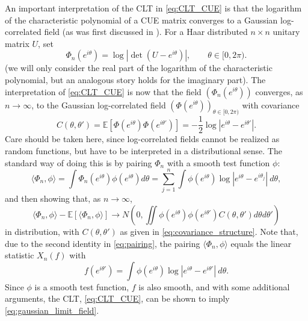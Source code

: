 \documentclass[11pt]{amsart}
\theoremstyle{plain}
\theoremstyle{remark}
\numberwithin{equation}{section}
\begin{document}
An important interpretation of the CLT in \eqref{eq:CLT_CUE} is that the logarithm of the characteristic polynomial of a CUE matrix converges to a Gaussian log-correlated field (as was first discussed in \cite{HKOC}). For  a Haar distributed $n\times n$ unitary matrix $U$, set 
\begin{equation}\label{eq:def_char_pol}
    \Phi_n(e^{i \theta}) = \log |\det (U-e^{i \theta})|, \qquad \theta \in [0,2 \pi).
\end{equation}
(we will only consider the real part of the logarithm of the characteristic polynomial, but an analogous story holds for the imaginary part). The interpretation of \eqref{eq:CLT_CUE} is now that the field $(\Phi_n(e^{i \theta}))$ converges, as $n \to \infty$, to the Gaussian log-correlated field $(\Phi(e^{i \theta}))_{\theta\in [0,2 \pi)}$ with covariance  
%
%
%
%
\begin{equation}
    \label{eq:covariance_structure}
    C(\theta,\theta')
    =\mathbb E \left[
    \Phi(e^{i \theta})\Phi(e^{i \theta'})
    \right]=-\frac{1}{2}\log|e^{i \theta}-e^{i \theta'}|. 
\end{equation}
Care should be taken here, since log-correlated fields cannot be realized as random functions, but have to be interpreted in a distributional sense. 
The standard way of doing this is by pairing $\Phi_n$ with a smooth test function $\phi$:
\begin{equation}
    \label{eq:pairing}
    \langle \Phi_n, \phi\rangle= \int \Phi_n(e^{i \theta}) \phi(e^{i \theta})d \theta
    = \sum_{j=1}^n \int \phi(e^{i \theta}) \log |e^{i \theta}-e^{i \theta_j}|\  d \theta,
\end{equation}
and then showing that, as $n\to \infty$,
\begin{equation}\label{eq:gaussian_limit_field}
 \langle \Phi_n, \phi\rangle-\mathbb E \left[ \langle \Phi_n, \phi\rangle\right]
 \to N\left(0,\iint \phi(e^{i \theta}) \phi(e^{i \theta'}) C(\theta,\theta') d\theta d\theta' \right)
\end{equation}
in distribution, with $ C(\theta,\theta')$ as given in \eqref{eq:covariance_structure}. Note that, due to the second identity in \eqref{eq:pairing},
the pairing $\langle \Phi_n, \phi\rangle$ equals the linear statistic $X_n(f)$ with  $$f(e^{i \theta'})=  \int \phi(e^{i \theta}) \log |e^{i \theta}-e^{i \theta'}|\  d \theta.$$
Since $\phi$ is a smooth test function, $f$ is also smooth, and with some additional arguments, the CLT, \eqref{eq:CLT_CUE}, can be shown to imply \eqref{eq:gaussian_limit_field}. 
\end{document}
